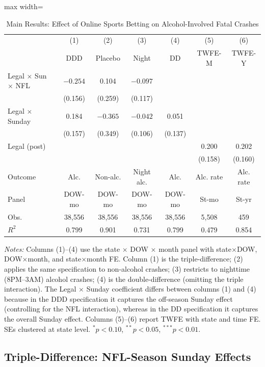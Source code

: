 \documentclass[12pt]{article}
\begin{document}
\begin{table}[H]
\centering
\caption{Main Results: Effect of Online Sports Betting on Alcohol-Involved Fatal Crashes}
\label{tab:main}
\begin{adjustbox}{max width=\textwidth}
\begin{tabular}{lcccccc}
\toprule
& (1) & (2) & (3) & (4) & (5) & (6) \\
& DDD & Placebo & Night & DD & TWFE-M & TWFE-Y \\
\midrule
Legal $\times$ Sun $\times$ NFL & $-0.254$ & 0.104 & $-0.097$ & & & \\
& (0.156) & (0.259) & (0.117) & & & \\[4pt]
Legal $\times$ Sunday & 0.184 & $-0.365$ & $-0.042$ & 0.051 & & \\
& (0.157) & (0.349) & (0.106) & (0.137) & & \\[4pt]
Legal (post) & & & & & 0.200 & 0.202 \\
& & & & & (0.158) & (0.160) \\[4pt]
\midrule
Outcome & Alc. & Non-alc. & Night alc. & Alc. & Alc. rate & Alc. rate \\
Panel & DOW-mo & DOW-mo & DOW-mo & DOW-mo & St-mo & St-yr \\
Obs. & 38,556 & 38,556 & 38,556 & 38,556 & 5,508 & 459 \\
$R^2$ & 0.799 & 0.901 & 0.731 & 0.799 & 0.479 & 0.854 \\
\bottomrule
\end{tabular}
\end{adjustbox}

\vspace{4pt}
{\small\emph{Notes:} Columns (1)--(4) use the state $\times$ DOW $\times$ month panel with state$\times$DOW, DOW$\times$month, and state$\times$month FE. Column (1) is the triple-difference; (2) applies the same specification to non-alcohol crashes; (3) restricts to nighttime (8PM--3AM) alcohol crashes; (4) is the double-difference (omitting the triple interaction). The Legal $\times$ Sunday coefficient differs between columns (1) and (4) because in the DDD specification it captures the off-season Sunday effect (controlling for the NFL interaction), whereas in the DD specification it captures the overall Sunday effect. Columns (5)--(6) report TWFE with state and time FE. SEs clustered at state level. $^{*}p < 0.10$, $^{**}p < 0.05$, $^{***}p < 0.01$.}
\end{table}

\subsection{Triple-Difference: NFL-Season Sunday Effects}
\end{document}
